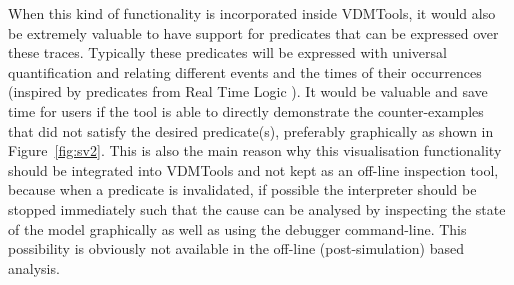 When this kind of functionality is incorporated inside VDMTools, it would
also be extremely valuable to have support for predicates that can be
expressed over these traces. Typically these predicates will be expressed
with universal quantification and relating different events and the times
of their occurrences (inspired by predicates from Real Time Logic 
\cite{Jahanian&86}). It would
be valuable and save time for users if the tool is able to directly
demonstrate the counter-examples that did not satisfy the desired
predicate(s), preferably graphically as shown in Figure~\ref{fig:sv2}.
This is also the main reason why this visualisation functionality should
be integrated into VDMTools and not kept as an off-line inspection tool,
because when a predicate is invalidated, if possible the interpreter should
be stopped immediately such that the cause can be analysed by inspecting
the state of the model graphically as well as using the debugger
command-line. This possibility is obviously not available in the
off-line (post-simulation) based analysis.


